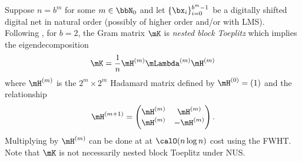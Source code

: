 \documentclass[acmsmall]{acmart}
\begin{document}
Suppose $n =b^m$ for some $m \in \bbN_0$ and let $\{\bx_i\}_{i=0}^{b^m-1}$ be a digitally shifted digital net in natural order (possibly of higher order and/or with LMS). Following \cite[Theorem 5.3.1,Theorem 5.3.2]{rathinavel.bayesian_QMC_sobol}, for $b=2$, the Gram matrix $\mK$ is \emph{nested block Toeplitz} which implies the eigendecomposition
$$\mK = \frac{1}{n} \mH^{(m)} \mLambda^{(m)} \mH^{(m)}$$ where $\mH^{(m)}$ is the $2^m \times 2^m$ Hadamard matrix defined by $\mH^{(0)} = (1)$ and the relationship 
$$\mH^{(m+1)} = \begin{pmatrix} \mH^{(m)} & \mH^{(m)} \\ \mH^{(m)} & - \mH^{(m)} \end{pmatrix}.$$
Multiplying by $\mH^{(m)}$ can be done at at $\calO(n \log n)$ cost using the FWHT. 
Note that $\mK$ is not necessarily nested block Toeplitz under NUS. %
\end{document}
